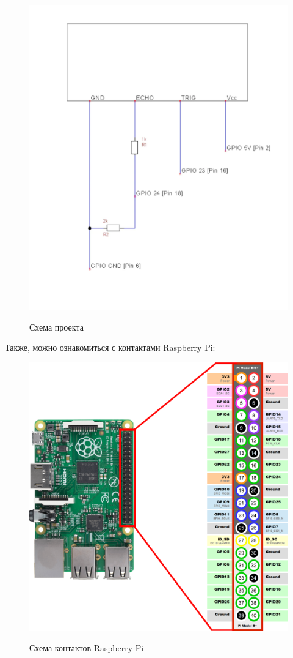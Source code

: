 \documentclass[a4paper, 14pt]{article}
\begin{document}
\begin{figure}[H]
	\centering
	\includegraphics[width=12cm]{screenshots/3.png}\\
	\caption{Схема проекта}
\end{figure}

Также, можно ознакомиться с контактами Raspberry Pi:

\begin{figure}[H]
	\centering
	\includegraphics[width=12cm]{screenshots/4.png}\\
	\caption{Схема контактов Raspberry Pi}
\end{figure}
\end{document}
